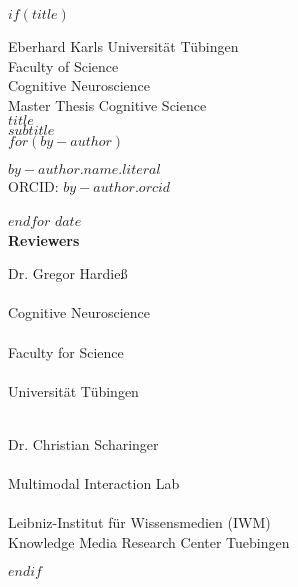 
$if(title)$
{
\centering
\huge Eberhard Karls Universität Tübingen \\
\Large Faculty of Science \\
\Large Cognitive Neuroscience \\
\vspace{6ex}
\huge Master Thesis Cognitive Science\\
\vspace{3ex}
\huge\textbf{$title$}\\
\huge $subtitle$\\
\vspace{3ex}
$for(by-author)$
\begin{center}
\Large $by-author.name.literal$\\
\large ORCID: \href{https://orcid.org/$by-author.orcid$}{$by-author.orcid$}
\end{center}
$endfor$
\vspace{3ex}
\Large $date$\\
\vspace{5ex}
\Large\textbf{Reviewers}\\
\vspace{2ex}
\parbox{0.5\textwidth}{
	\begin{center}
		{\Large Dr. Gregor Hardieß}\\
		~\\
		\large Cognitive Neuroscience\\
		~\\
		Faculty for Science\\
		~\\
		Universität Tübingen\\
		~\\
	\end{center}}
\hfill
\parbox{0.5\textwidth}{
	\begin{center}
  		{\Large Dr. Christian Scharinger}\\
  		~\\
  		\large Multimodal Interaction Lab\\
  		~\\
  		Leibniz-Institut für Wissensmedien (IWM)\\
  		Knowledge Media Research Center Tuebingen
  	\end{center}
 }
}
$endif$
